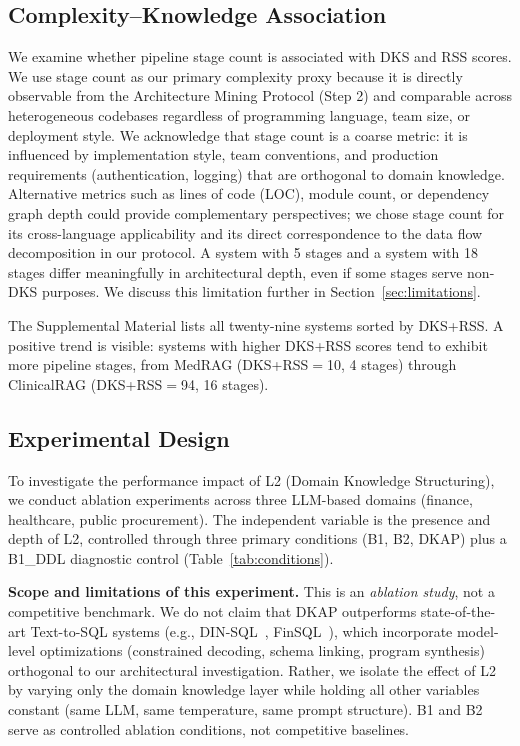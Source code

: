 \documentclass[fleqn,10pt,lineno]{wlpeerj}
\begin{document}
\subsection{Complexity--Knowledge Association}

We examine whether pipeline stage count is associated with DKS and RSS scores. We use stage count as our primary complexity proxy because it is directly observable from the Architecture Mining Protocol (Step 2) and comparable across heterogeneous codebases regardless of programming language, team size, or deployment style. We acknowledge that stage count is a coarse metric: it is influenced by implementation style, team conventions, and production requirements (authentication, logging) that are orthogonal to domain knowledge. Alternative metrics such as lines of code (LOC), module count, or dependency graph depth could provide complementary perspectives; we chose stage count for its cross-language applicability and its direct correspondence to the data flow decomposition in our protocol. A system with 5 stages and a system with 18 stages differ meaningfully in architectural depth, even if some stages serve non-DKS purposes. We discuss this limitation further in Section~\ref{sec:limitations}.

The Supplemental Material lists all twenty-nine systems sorted by DKS+RSS. A positive trend is visible: systems with higher DKS+RSS scores tend to exhibit more pipeline stages, from MedRAG (DKS+RSS$=$10, 4 stages) through ClinicalRAG (DKS+RSS$=$94, 16 stages).


\subsection{Experimental Design}

To investigate the performance impact of L2 (Domain Knowledge Structuring), we conduct ablation experiments across three LLM-based domains (finance, healthcare, public procurement). The independent variable is the presence and depth of L2, controlled through three primary conditions (B1, B2, DKAP) plus a B1\_DDL diagnostic control (Table~\ref{tab:conditions}).

\textbf{Scope and limitations of this experiment.} This is an \textit{ablation study}, not a competitive benchmark. We do not claim that DKAP outperforms state-of-the-art Text-to-SQL systems (e.g., DIN-SQL~\citep{pourreza2023dinsql}, FinSQL~\citep{finsql}), which incorporate model-level optimizations (constrained decoding, schema linking, program synthesis) orthogonal to our architectural investigation. Rather, we isolate the effect of L2 by varying only the domain knowledge layer while holding all other variables constant (same LLM, same temperature, same prompt structure). B1 and B2 serve as controlled ablation conditions, not competitive baselines.
\end{document}
